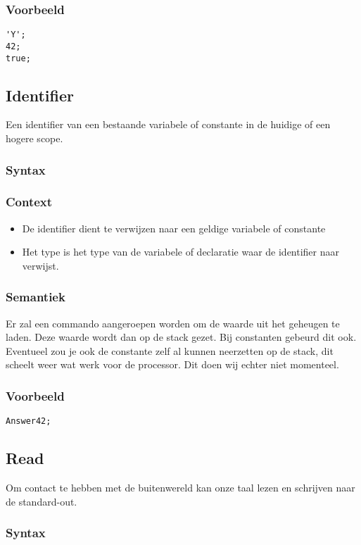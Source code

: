 \documentclass[]{article}
\begin{document}
\subsubsection{Voorbeeld}
\begin{lstlisting}[style=SELMA]
'Y';
42;
true;
\end{lstlisting}

\subsection{Identifier}
Een identifier van een bestaande variabele of constante in de huidige of een hogere scope.
\subsubsection{Syntax}

\subsubsection{Context}
\begin{itemize}
\item De identifier dient te verwijzen naar een geldige variabele of constante
\item Het type is het type van de variabele of declaratie waar de identifier naar verwijst.
\end{itemize}
\subsubsection{Semantiek}
Er zal een commando aangeroepen worden om de waarde uit het geheugen te laden. Deze waarde wordt dan op de stack gezet. Bij constanten gebeurd dit ook. Eventueel zou je ook de constante zelf al kunnen neerzetten op de stack, dit scheelt weer wat werk voor de processor. Dit doen wij echter niet momenteel.
\subsubsection{Voorbeeld}
\begin{lstlisting}[style=SELMA]
Answer42;
\end{lstlisting}

\subsection{Read}
Om contact te hebben met de buitenwereld kan onze taal lezen en schrijven naar de standard-out. 
\subsubsection{Syntax}

\end{document}

